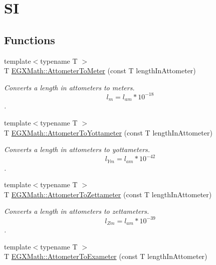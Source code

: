 \hypertarget{group___e_g_x_math-_conversions-_length_conversions-_s_i-_attometer-_s_i}{}\section{SI}
\label{group___e_g_x_math-_conversions-_length_conversions-_s_i-_attometer-_s_i}
\subsection*{Functions}
\begin{DoxyCompactItemize}
\item 
{\footnotesize template$<$typename T $>$ }\\T \mbox{\hyperlink{group___e_g_x_math-_conversions-_length_conversions-_s_i-_attometer-_s_i_gaa987cce911ce54c3022444537c705b97}{E\+G\+X\+Math\+::\+Attometer\+To\+Meter}} (const T length\+In\+Attometer)
\begin{DoxyCompactList}\small\item\em Converts a length in attometers to meters. \[ l_{m}=l_{am}* 10^{-18} \]. \end{DoxyCompactList}\item 
{\footnotesize template$<$typename T $>$ }\\T \mbox{\hyperlink{group___e_g_x_math-_conversions-_length_conversions-_s_i-_attometer-_s_i_gaaa5d4078879169021c8f2857c02a7aed}{E\+G\+X\+Math\+::\+Attometer\+To\+Yottameter}} (const T length\+In\+Attometer)
\begin{DoxyCompactList}\small\item\em Converts a length in attometers to yottameters. \[ l_{Ym}=l_{am} * 10^{-42} \]. \end{DoxyCompactList}\item 
{\footnotesize template$<$typename T $>$ }\\T \mbox{\hyperlink{group___e_g_x_math-_conversions-_length_conversions-_s_i-_attometer-_s_i_ga64b586463e4d2d7bbc63e43e8205383b}{E\+G\+X\+Math\+::\+Attometer\+To\+Zettameter}} (const T length\+In\+Attometer)
\begin{DoxyCompactList}\small\item\em Converts a length in attometers to zettameters. \[ l_{Zm}=l_{am} * 10^{-39} \]. \end{DoxyCompactList}\item 
{\footnotesize template$<$typename T $>$ }\\T \mbox{\hyperlink{group___e_g_x_math-_conversions-_length_conversions-_s_i-_attometer-_s_i_gaca9be6820446effaa50024d2ccc3eea8}{E\+G\+X\+Math\+::\+Attometer\+To\+Exameter}} (const T length\+In\+Attometer)

\end{DoxyCompactItemize}
